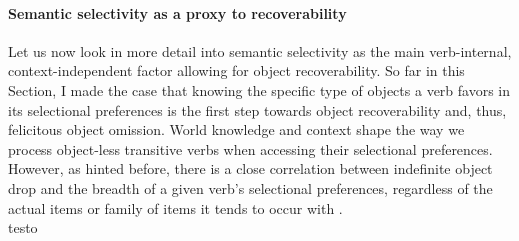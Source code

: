\paragraph{Semantic selectivity as a proxy to recoverability}

Let us now look in more detail into semantic selectivity as the main verb-internal, context-independent factor allowing for object recoverability. So far in this Section, I made the case that knowing the specific type of objects a verb favors in its selectional preferences is the first step towards object recoverability and, thus, felicitous object omission. World knowledge and context shape the way we process object-less transitive verbs when accessing their selectional preferences. However, as hinted before, there is a close correlation between indefinite object drop and the breadth of a given verb's selectional preferences, regardless of the actual items or family of items it tends to occur with \parencite{Garcia-VelascoMunoz2002, Liu2008, Glass2020, Medina2007, MaoueneEtAl2011, OlsenResnik1997, Resnik1993, Resnik1996}.\\
testo




